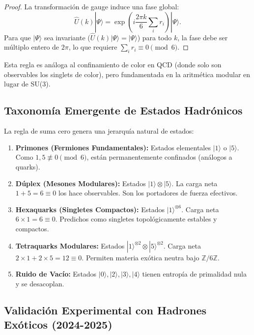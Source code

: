 \documentclass[11pt, a4paper]{article}
\theoremstyle{plain}
\theoremstyle{definition}
\newcommand{\Zmod}{\mathbb{Z}/6\mathbb{Z}}
\begin{document}
\begin{proof}
La transformación de gauge induce una fase global:
\begin{equation}
\hat{U}(k)|\Psi\rangle = \exp\left(i\frac{2\pi k}{6}\sum_i r_i\right)|\Psi\rangle.
\end{equation}
Para que $|\Psi\rangle$ sea invariante ($\hat{U}(k)|\Psi\rangle = |\Psi\rangle$) para todo $k$, la fase debe ser múltiplo entero de $2\pi$, lo que requiere $\sum_i r_i \equiv 0 \pmod{6}$.
\end{proof}

Esta regla es análoga al confinamiento de color en QCD (donde solo son observables los singlets de color), pero fundamentada en la aritmética modular en lugar de SU(3).

\subsection{Taxonomía Emergente de Estados Hadrónicos}

La regla de suma cero genera una jerarquía natural de estados:

\begin{enumerate}
    \item \textbf{Primones (Fermiones Fundamentales):} Estados elementales $|1\rangle$ o $|5\rangle$. Como $1,5 \not\equiv 0 \pmod{6}$, están permanentemente confinados (análogos a quarks).
    
    \item \textbf{Dúplex (Mesones Modulares):} Estados $|1\rangle \otimes |5\rangle$. La carga neta $1+5=6 \equiv 0$ los hace observables. Son los portadores de fuerza efectivos.
    
    \item \textbf{Hexaquarks (Singletes Compactos):} Estados $|1\rangle^{\otimes 6}$. Carga neta $6 \times 1 = 6 \equiv 0$. Predichos como singletes topológicamente estables y compactos.
    
    \item \textbf{Tetraquarks Modulares:} Estados $|1\rangle^{\otimes 2} \otimes |5\rangle^{\otimes 2}$. Carga neta $2\times1 + 2\times5 = 12 \equiv 0$. Permiten materia exótica neutra bajo $\Zmod$.
    
    \item \textbf{Ruido de Vacío:} Estados $|0\rangle, |2\rangle, |3\rangle, |4\rangle$ tienen entropía de primalidad nula y se desacoplan.
\end{enumerate}

\subsection{Validación Experimental con Hadrones Exóticos (2024-2025)}
\end{document}
